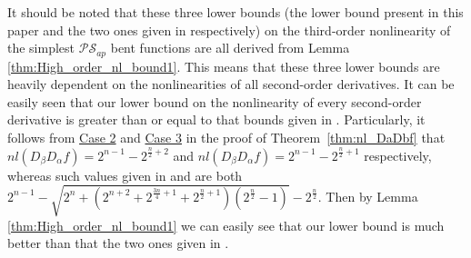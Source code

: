 \documentclass[preprint,10pt]{elsarticle}
\newcommand{\0}{\textbf{0}}
\newcommand{\1}{\textbf{1}}
\theoremstyle{plain}
\begin{document}
    
    It should be noted that these three lower bounds (the lower bound present in this paper and 
    the two ones given in \cite{Carlet2011NL_Profile_Dillon,TangCT2013NL_2bent} respectively) on the third-order nonlinearity of the simplest $\mathcal{PS}_{ap}$ bent functions
    are all derived from Lemma \ref{thm:High_order_nl_bound1}.
    This means that these three lower bounds are heavily dependent on the nonlinearities of all second-order derivatives.
    It can be easily seen that our lower bound on the nonlinearity of every second-order derivative is greater than or equal to
    that bounds given in \cite{Carlet2011NL_Profile_Dillon,TangCT2013NL_2bent}.
    Particularly,  it follows from \hyperref[case_2]{Case 2} and \hyperref[case_3]{Case 3} in the proof of Theorem~\ref{thm:nl_DaDbf}
    that 
    $nl(D_{\beta}D_{\alpha}f)=2^{n-1}-2^{\frac{n}{2}+2}$
    and $nl(D_{\beta}D_{\alpha}f)=2^{n-1}-2^{\frac{n}{2}+1}$ respectively,
    whereas such values  given in \cite{Carlet2011NL_Profile_Dillon} and \cite{TangCT2013NL_2bent}
    are both $2^{n-1}-\sqrt{2^n+(2^{n+2}+2^{\frac{3n}{4}+1}+2^{\frac{n}{2}+1})(2^{\frac{n}{2}}-1)}-2^{\frac{n}{2}}$.
    Then by Lemma \ref{thm:High_order_nl_bound1} we can easily see that our lower bound is 
    much better than that the two ones given in \cite{Carlet2011NL_Profile_Dillon,TangCT2013NL_2bent}.

\end{document}
